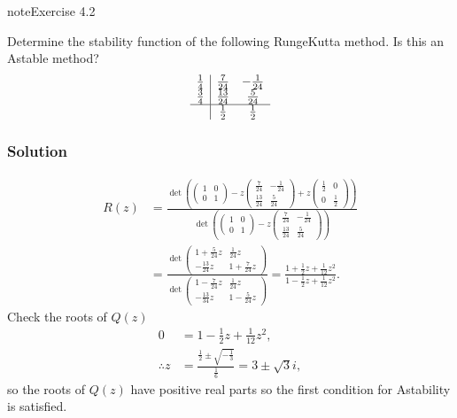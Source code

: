 \documentclass[letterpaper,10pt,english]{jupyterBook}
\begin{document}
\begin{sphinxadmonition}{note}{Exercise 4.2}

\sphinxAtStartPar
Determine the stability function of the following Runge\sphinxhyphen{}Kutta method. Is this an A\sphinxhyphen{}stable method?
\begin{align*}
    \begin{array}{c|cc}
        \frac{1}{4} & \frac{7}{24} & -\frac{1}{24}\\
        \frac{3}{4} & \frac{13}{24} & \frac{5}{24}\\ \hline
        & \frac{1}{2} & \frac{1}{2}
    \end{array}
\end{align*}\subsubsection*{Solution}
\begin{align*}
    R(z) &= \frac{\det \left( 
    \begin{pmatrix} 1 & 0 \\ 0 & 1 \end{pmatrix} - z
    \begin{pmatrix} \frac{7}{24} & -\frac{1}{24} \\ \frac{13}{24} & \frac{5}{24} \end{pmatrix} + z
    \begin{pmatrix} \frac{1}{2} & 0 \\ 0 & \frac{1}{2} \end{pmatrix} \right)}{\det \left(
    \begin{pmatrix} 1 & 0 \\ 0 & 1 \end{pmatrix} - z
    \begin{pmatrix} \frac{7}{24} & -\frac{1}{24} \\ \frac{13}{24} & \frac{5}{24} \end{pmatrix} \right)} \\
    &= \frac{\det 
    \begin{pmatrix} 1 + \frac{5}{24} z & \frac{1}{24} z \\ -\frac{13}{24} z & 1 + \frac{7}{24} z \end{pmatrix}}{\det
    \begin{pmatrix} 1 - \frac{7}{24} z & \frac{1}{24} z \\ -\frac{13}{34} z & 1 - \frac{5}{24} z \end{pmatrix}}
    = \frac{1 + \frac{1}{2} z + \frac{1}{12} z^2}{1 - \frac{1}{2} z + \frac{1}{12} z^2}.
\end{align*}
\sphinxAtStartPar
Check the roots of \(Q(z)\)
\begin{align*}
    0 &= 1 - \frac{1}{2} z + \frac{1}{12} z^2, \\
    \therefore z &= \frac{\frac{1}{2} \pm \sqrt{-\frac{1}{3}}}{\frac{1}{6}}
    = 3 \pm \sqrt{3}i,
\end{align*}
\sphinxAtStartPar
so the roots of \(Q(z)\) have positive real parts so the first condition for A\sphinxhyphen{}stability is satisfied.


\end{sphinxadmonition}
\end{document}
